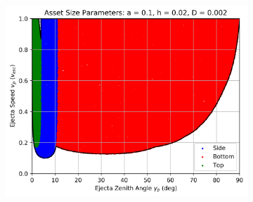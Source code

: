 \documentclass{article}
\begin{document}
\begin{figure}
\begin{subfigure}[t]{.32\textwidth}
	\end{subfigure}
	\begin{subfigure}[t]{.32\textwidth}
		\centering
		\includegraphics[width=.98\linewidth]{asset_speed_zenith_plot_1.010e+00_1.000e-01_2.000e-02_2.000e-03.png}  
		\label{fig:sub-asset_speed_zenith_h1_3}
	\end{subfigure}
	
	

\end{figure}
\end{document}
